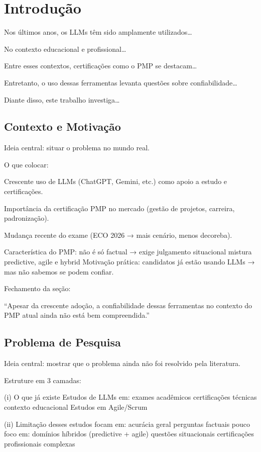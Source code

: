 \chapter{Introdução}
\label{Introdução}

Nos últimos anos, os LLMs têm sido amplamente utilizados…

No contexto educacional e profissional…

Entre esses contextos, certificações como o PMP se destacam…

Entretanto, o uso dessas ferramentas levanta questões sobre confiabilidade…

Diante disso, este trabalho investiga…



\section{Contexto e Motivação}

Ideia central: situar o problema no mundo real.

O que colocar:

Crescente uso de LLMs (ChatGPT, Gemini, etc.) como apoio a estudo e certificações.

Importância da certificação PMP no mercado (gestão de projetos, carreira, padronização).

Mudança recente do exame (ECO 2026 → mais cenário, menos decoreba).

Característica do PMP:
não é só factual → exige julgamento situacional
mistura predictive, agile e hybrid
Motivação prática: candidatos já estão usando LLMs → mas não sabemos se podem confiar.

Fechamento da seção:

“Apesar da crescente adoção, a confiabilidade dessas ferramentas no contexto do PMP atual ainda não está bem compreendida.”



\section{Problema de Pesquisa}

Ideia central: mostrar que o problema ainda não foi resolvido pela literatura.

Estruture em 3 camadas:

(i) O que já existe
Estudos de LLMs em:
exames acadêmicos
certificações técnicas
contexto educacional
Estudos em Agile/Scrum 


(ii) Limitação desses estudos
focam em:
acurácia geral
perguntas factuais
pouco foco em:
domínios híbridos (predictive + agile)
questões situacionais
certificações profissionais complexas

